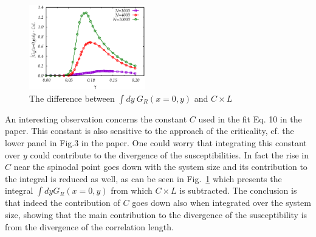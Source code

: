 \documentclass[aps,pnas,float]{revtex4}
\begin{document}

\begin{figure}[htpb]
 \includegraphics[width=0.45\textwidth]{spinodalSIFig3.eps}
 \caption{The difference between $\int dy\ G_R(x=0,y)$ and $C\times L$}
\label{Ceffect}
\end{figure}

An interesting observation concerns the constant $C$ used in the fit Eq. 10 in the paper. This constant
is also sensitive to the approach of the criticality, cf. the lower panel in Fig.3 in the paper. One could worry
that integrating this constant over $y$ could contribute to the divergence of the susceptibilities. In fact
the rise in $C$ near the spinodal point goes down with the system size and its contribution to the integral
is reduced as well, as can be seen in Fig.~\ref{Ceffect} which presents the integral $\int dy G_R(x=0,y)$ from
which $C\times L$ is subtracted.
The conclusion is that indeed the contribution of $C$ goes down also when integrated over the system
size, showing that the main contribution to the divergence of the susceptibility is from the divergence
of the correlation length.
\end{document}
